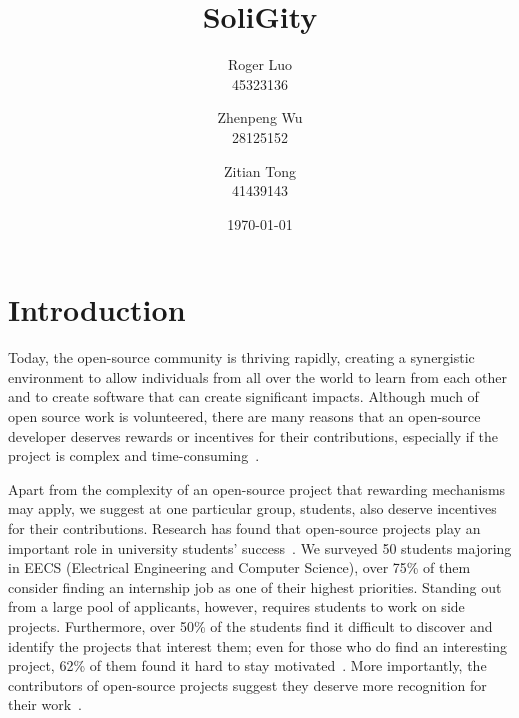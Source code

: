 \documentclass[12pt]{article}
\title{SoliGity}
\author{  
  Roger Luo\\
  45323136
  \and
  Zhenpeng Wu\\
  28125152 
  \and
  Zitian Tong\\
  41439143
}
\date{\today}
\renewcommand{\_}{\kern-1.5pt\textunderscore\kern-1.5pt}
\begin{document}
\maketitle

\section{Introduction}

Today, the open-source community is thriving rapidly, creating a synergistic environment to allow
individuals from all over the world to learn from each other and to create software that can create
significant impacts. Although much of open source work is volunteered, there are many reasons that
an open-source developer deserves rewards or incentives for their contributions, especially if the
project is complex and time-consuming~\cite{community_collaboration}.

Apart from the complexity of an open-source project that rewarding mechanisms may apply, we suggest
at one particular group, students, also deserve incentives for their contributions. Research has
found that open-source projects play an important role in university students’ success~\cite{open_source_guides}.
We surveyed 50 students majoring in EECS (Electrical Engineering and Computer Science), over 75\% of
them consider finding an internship job as one of their highest priorities. Standing out from a large
pool of applicants, however, requires students to work on side projects. Furthermore, over 50\% of the
students find it difficult to discover and identify the projects that interest them; even for those
who do find an interesting project, 62\% of them found it hard to stay motivated~\cite{thomas_toch_2014}.
More importantly, the contributors of open-source projects suggest they deserve more recognition for
their work~\cite{freecodecamp.org_2018}.
\end{document}
